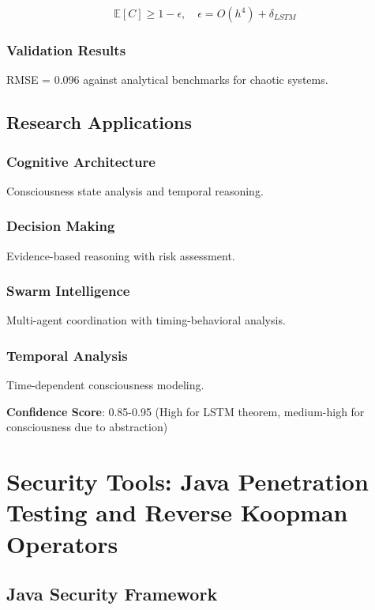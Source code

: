 \documentclass[11pt,a4paper]{article}
\begin{document}
\begin{equation}
\mathbb{E}[C] \geq 1 - \epsilon, \quad \epsilon = O(h^4) + \delta_{LSTM}
\label{eq:lstm_bounds}
\end{equation}

\subsubsection{Validation Results}
RMSE = 0.096 against analytical benchmarks for chaotic systems.

\subsection{Research Applications}

\subsubsection{Cognitive Architecture}
Consciousness state analysis and temporal reasoning.

\subsubsection{Decision Making}
Evidence-based reasoning with risk assessment.

\subsubsection{Swarm Intelligence}
Multi-agent coordination with timing-behavioral analysis.

\subsubsection{Temporal Analysis}
Time-dependent consciousness modeling.

\textbf{Confidence Score}: 0.85-0.95 (High for LSTM theorem, medium-high for consciousness due to abstraction)

\section{Security Tools: Java Penetration Testing and Reverse Koopman Operators}
\label{sec:security}

\subsection{Java Security Framework}
\end{document}
